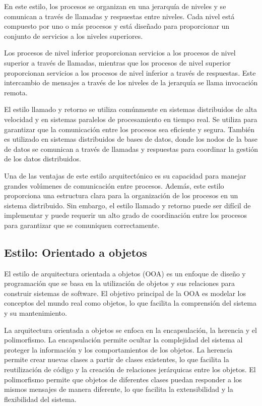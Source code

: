 \documentclass[executivepaper]{article}
\begin{document}
En este estilo, los procesos se organizan en una jerarquía de niveles y se comunican a través de llamadas y respuestas entre niveles. Cada nivel está compuesto por uno o más procesos y está diseñado para proporcionar un conjunto de servicios a los niveles superiores.

Los procesos de nivel inferior proporcionan servicios a los procesos de nivel superior a través de llamadas, mientras que los procesos de nivel superior proporcionan servicios a los procesos de nivel inferior a través de respuestas. Este intercambio de mensajes a través de los niveles de la jerarquía se llama invocación remota.

El estilo llamado y retorno se utiliza comúnmente en sistemas distribuidos de alta velocidad y en sistemas paralelos de procesamiento en tiempo real. Se utiliza para garantizar que la comunicación entre los procesos sea eficiente y segura. También es utilizado en sistemas distribuidos de bases de datos, donde los nodos de la base de datos se comunican a través de llamadas y respuestas para coordinar la gestión de los datos distribuidos.

Una de las ventajas de este estilo arquitectónico es su capacidad para manejar grandes volúmenes de comunicación entre procesos. Además, este estilo proporciona una estructura clara para la organización de los procesos en un sistema distribuido. Sin embargo, el estilo llamado y retorno puede ser difícil de implementar y puede requerir un alto grado de coordinación entre los procesos para garantizar que se comuniquen correctamente.

\subsection*{Estilo: Orientado a objetos}
El estilo de arquitectura orientada a objetos (OOA) es un enfoque de diseño y programación que se basa en la utilización de objetos y sus relaciones para construir sistemas de software. El objetivo principal de la OOA es modelar los conceptos del mundo real como objetos, lo que facilita la comprensión del sistema y su mantenimiento.

La arquitectura orientada a objetos se enfoca en la encapsulación, la herencia y el polimorfismo. La encapsulación permite ocultar la complejidad del sistema al proteger la información y los comportamientos de los objetos. La herencia permite crear nuevas clases a partir de clases existentes, lo que facilita la reutilización de código y la creación de relaciones jerárquicas entre los objetos. El polimorfismo permite que objetos de diferentes clases puedan responder a los mismos mensajes de manera diferente, lo que facilita la extensibilidad y la flexibilidad del sistema.
\end{document}
